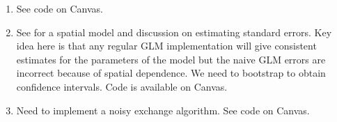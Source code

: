\documentclass[11pt]{article}
\begin{document}
\begin{enumerate}
\item See code on Canvas.

\item See \cite{preisler1993modelling} for a spatial model and discussion on estimating standard errors. Key idea here is that any regular GLM implementation will give consistent estimates for the parameters of the model but the naive GLM errors are incorrect because of spatial dependence. We need to bootstrap to obtain confidence intervals. Code is available on Canvas.

\item Need to implement a noisy exchange algorithm. See code on Canvas.


\end{enumerate}





\end{document}
